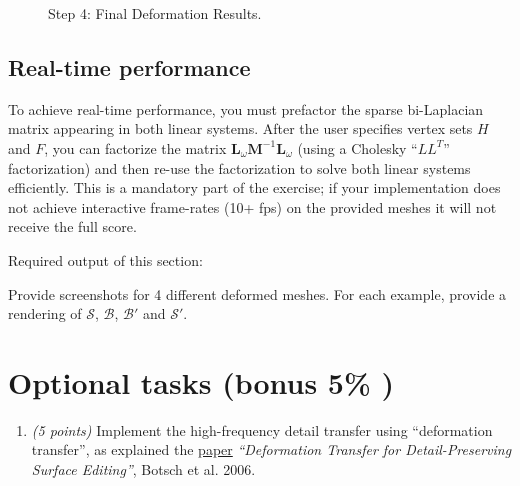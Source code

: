 \documentclass[11pt]{amsart}
\newcommand{\itemz}[1]{{\begin{itemize}{#1}\end{itemize}}}
\begin{document}
\begin{figure}
   \centering
\hspace{0.9cm}
   \caption{Step 4: Final Deformation Results.}
   \label{fig:final}
\end{figure}

\subsection{Real-time performance}
To achieve real-time performance, you must prefactor the sparse bi-Laplacian matrix appearing in both linear systems. After the user specifies vertex sets $H$ and $F$, you can factorize the matrix $\textbf{L}_\omega \textbf{M}^{-1} \textbf{L}_\omega$ (using a Cholesky ``$LL^T$'' factorization) and then re-use the factorization to solve both linear systems efficiently. This is a mandatory part of the exercise; if your implementation does not achieve interactive frame-rates (10+ fps) on the provided meshes it will not receive the full score.


Required output of this section:
\itemz{
\item{Provide screenshots for 4 different deformed meshes. For each example, provide a rendering of $\mathcal{S}$, $\mathcal{B}$, $\mathcal{B}'$ and $\mathcal{S}'$.}
}

\section{Optional tasks (bonus 5\% )}
\begin{enumerate}
\item
    \emph{(5 points)} Implement the high-frequency detail transfer using ``deformation transfer'', as explained the \href{http://graphics.uni-bielefeld.de/publications/disclaimer.php?dlurl=vmv06.pdf}{paper} \emph{``Deformation Transfer for Detail-Preserving Surface Editing''}, Botsch et al. 2006.
\end{enumerate}
\end{document}
